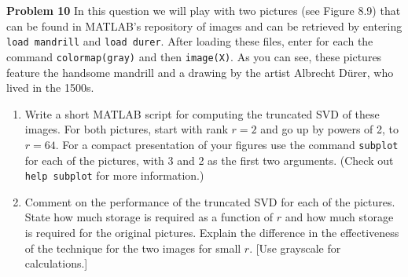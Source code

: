\documentclass[12pt]{article}
\newcommand{\problem}[1]{\hspace{-4 ex} \large \textbf{Problem #1} }
\begin{document}
\bigbreak

\problem{10} In this question we will play with two pictures (see Figure 8.9) that can be found in MATLAB's repository of images and can be retrieved by entering \texttt{load mandrill} and \texttt{load durer}. After loading these files, enter for each the command \texttt{colormap(gray)} and then \texttt{image(X)}. As you can see, these pictures feature the handsome mandrill and a drawing by the artist Albrecht D\"urer, who lived in the 1500s.
\begin{enumerate}[leftmargin=0.6cm,label=(\alph*)]
	\item Write a short MATLAB script for computing the truncated SVD of these images. For both pictures, start with rank $ r = 2 $ and go up by powers of 2, to $ r = 64 $. For a compact presentation of your figures use the command \texttt{subplot} for each of the pictures, with 3 and 2 as the first two arguments. (Check out \texttt{help subplot} for more information.)
	\item Comment on the performance of the truncated SVD for each of the pictures. State how much storage is required as a function of $ r $ and how much storage is required for the original pictures. Explain the difference in the effectiveness of the technique for the two images for small $ r $. [Use grayscale for calculations.]
\end{enumerate}
\end{document}
